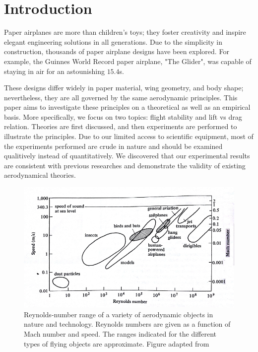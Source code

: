 \section{Introduction}

Paper airplanes are more than children's toys; they foster creativity and inspire elegant engineering solutions in all generations. 
Due to the simplicity in construction, thousands of paper airplane designs have been explored. For example, the Guinnes World Record 
paper airplane, "The Glider",  was capable of staying in air for an astounishing $15.4$s.  

These designs differ widely in paper material, wing geometry, 
and body shape; nevertheless, they are all governed by the same aerodynamic principles. This paper aims to investigate these principles
 on a theoretical as well as an empirical basis. More specifically, we focus on two topics: flight stability and lift vs drag relation. 
Theories are first discussed, and then experiments are performed to illustrate the principles. Due to our limited access to scientific 
equipment, most of the experiments performed are crude in nature and should be examined qualitively instead of quantitatively. We discovered
that our experimental results are consistent with previous researches and demonstrate the validity of existing aerodynamical theories.

\begin{figure}[hl]
	\centering
		\includegraphics[scale=.5]{figures/reynoldsrange.png}
		\caption{Reynolds-number range of a variety of aerodynamic objects in nature and technology. Reynolds numbers are given as a function of Mach number and speed. The ranges indicated for the different types of flying objects are approximate. Figure adapted from \cite{wegener}}
	\label{fig:reynoldsrange}
\end{figure}


